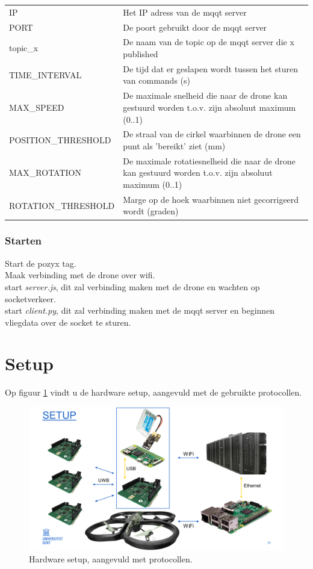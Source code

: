 \begin{tabular}{ l | l }
IP & Het IP adress van de mqqt server\\
PORT & De poort gebruikt door de mqqt server\\
topic\_x & De naam van de topic op de mqqt server die x published\\
TIME\_INTERVAL & De tijd dat er geslapen wordt tussen het sturen van commands (s)\\
MAX\_SPEED & De maximale snelheid die naar de drone kan gestuurd worden t.o.v. zijn absoluut maximum (0..1)\\
POSITION\_THRESHOLD & De straal van de cirkel waarbinnen de drone een punt als 'bereikt' ziet (mm)\\
MAX\_ROTATION & De maximale rotatiesnelheid die naar de drone kan gestuurd worden t.o.v. zijn absoluut maximum (0..1)\\
ROTATION\_THRESHOLD & Marge op de hoek waarbinnen niet gecorrigeerd wordt (graden)\\
\end{tabular}




\subsubsection{Starten}


Start de pozyx tag.\\
Maak verbinding met de drone over wifi.\\
start \textit{server.js}, dit zal verbinding maken met de drone en wachten op socketverkeer.\\
start \textit{client.py}, dit zal verbinding maken met de mqqt server en beginnen vliegdata over de socket te sturen.\\


\section{Setup} \label{sec:setup}
Op figuur \ref{fig:setup} vindt u de hardware setup, aangevuld met de gebruikte protocollen.
\begin{figure}[p]
	\centering
	\includegraphics[width=\textwidth]{Setup}
	\caption[Setup]{Hardware setup, aangevuld met protocollen.}
	\label{fig:setup}
\end{figure}

